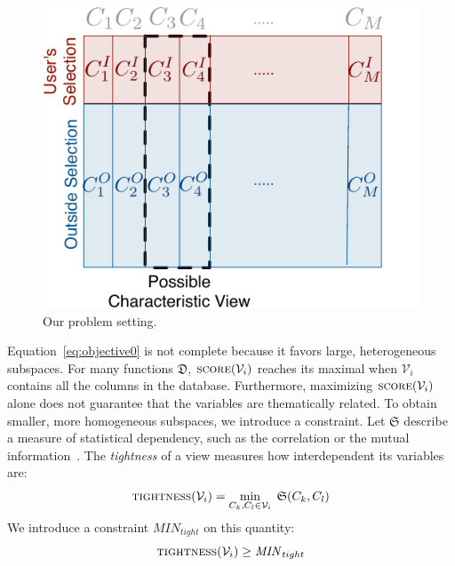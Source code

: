 \begin{figure}[t!]
    \centering
    \includegraphics[width=.7\columnwidth]{Images/Setting}
    \caption{Our problem setting.}
    \label{fig:setting}
\end{figure}
Equation~\ref{eq:objective0} is not complete because it favors large,
he\-terogeneous subspaces.  For many functions $\mathfrak{D}$, $\textsc{score}
(\mathcal{V}_i)$ reaches its maximal when $\mathcal{V}_i$ contains all the
columns in the database. Furthermore, maximizing $\textsc{score}
(\mathcal{V}_i)$ alone does not guarantee that the variables are thematically
related. To obtain smaller, more homogeneous subspaces, we introduce a
constraint. Let $\mathfrak{S}$ describe a measure of statistical dependency,
such as  the correlation or the mutual information~\cite{wasserman2013all}. The
\emph{tightness} of a view measures how interdependent its variables are:
\begin{equation}
    \textsc{tightness}(\mathcal{V}_i) = \min_{C_k,C_l \in \mathcal{V}_i}\;
    \mathfrak{S}(C_k, C_l) 
\end{equation}
We introduce a constraint $\mathit{MIN}_{tight}$ on this quantity:
\begin{equation}
    \textsc{tightness}(\mathcal{V}_i) \geq \mathit{MIN}_{tight}
\end{equation}
